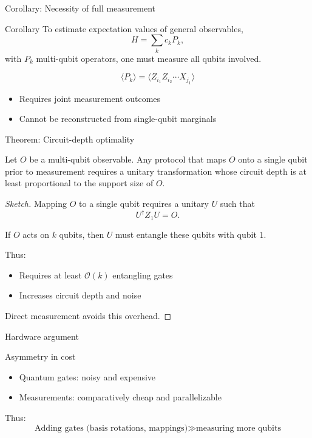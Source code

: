 \documentclass[aspectratio=169]{beamer}
\begin{document}

\begin{frame}{Corollary: Necessity of full measurement}
\begin{block}{Corollary}
To estimate expectation values of general observables,
\[
H = \sum_k c_k P_k,
\]
with $P_k$ multi-qubit operators, one must measure all qubits involved.
\end{block}

\[
\langle P_k \rangle = \langle Z_{i_1} Z_{i_2} \cdots X_{j_1} \rangle
\]

\medskip

\begin{itemize}
\item Requires joint measurement outcomes
\item Cannot be reconstructed from single-qubit marginals
\end{itemize}
\end{frame}


\begin{frame}{Theorem: Circuit-depth optimality}
\begin{theorem}
Let $O$ be a multi-qubit observable. Any protocol that maps $O$ onto a single qubit prior to measurement requires a unitary transformation whose circuit depth is at least proportional to the support size of $O$.
\end{theorem}

\begin{proof}[Sketch]
Mapping $O$ to a single qubit requires a unitary $U$ such that
\[
U^\dagger Z_1 U = O.
\]

If $O$ acts on $k$ qubits, then $U$ must entangle these qubits with qubit $1$.

Thus:
\begin{itemize}
\item Requires at least $\mathcal{O}(k)$ entangling gates
\item Increases circuit depth and noise
\end{itemize}

Direct measurement avoids this overhead.
\end{proof}
\end{frame}


\begin{frame}{Hardware argument}
\begin{block}{Asymmetry in cost}
\begin{itemize}
\item Quantum gates: noisy and expensive
\item Measurements: comparatively cheap and parallelizable
\end{itemize}
\end{block}

\medskip

Thus:
\[
\text{Adding gates (basis rotations, mappings)} \gg \text{measuring more qubits}
\]
\end{frame}
\end{document}
